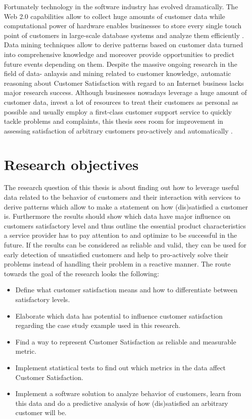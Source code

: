 Fortunately technology in the software industry has evolved dramatically. The Web 2.0 capabilities allow to collect huge amounts of customer data while computational power of hardware enables businesses to store every single touch point of customers in large-scale database systems and analyze them efficiently \cite{chen2003understanding} \cite{neckel2015}.  Data mining techniques allow to derive patterns based on customer data turned into comprehensive knowledge and moreover provide opportunities to predict future events depending on them. Despite the massive ongoing research in the field of data- anlaysis and mining related to customer knowledge, automatic reasoning about Customer Satisfaction with regard to an Internet business lacks major research success. Although businesses nowadays leverage a huge amount of customer data, invest a lot of resources to treat their customers as personal as possible and usually employ a first-class customer support service to quickly tackle problems and complaints, this thesis sees room for improvement in assessing satisfaction of arbitrary customers pro-actively and automatically \cite{neckel2015}.

\section{Research objectives}
The research question of this thesis is about finding out how to leverage useful data related to the behavior of customers and their interaction with services to derive patterns which allow to make a statement on how (dis)satisfied a customer is. Furthermore the results should show which data have major influence on customers satisfactory level and thus outline the essential product characteristics a service provider has to pay attention to and optimize to be successful in the future. If the results can be considered as reliable and valid, they can be used for early detection of unsatisfied customers and help to pro-actively solve their problems instead of handling their problem in a reactive manner.
The route towards the goal of the research looks the following:

\begin{itemize}
	\item Define what customer satisfaction means and how to differentiate between satisfactory levels.
	\item Elaborate which data has potential to influence customer satisfaction regarding the case study example used in this research. 
	\item Find a way to represent Customer Satisfaction as reliable and measurable metric.
	\item Implement statistical tests to find out which metrics in the data affect Customer Satisfaction. 
	\item Implement a software solution to analyze behavior of customers, learn from this data and do a predictive analysis of how (dis)satisfied an arbitrary customer will be.
\end{itemize}

